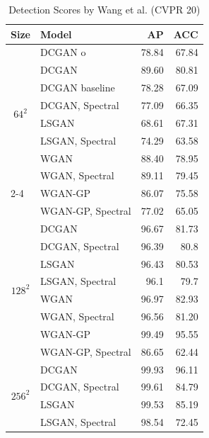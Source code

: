 \documentclass[letterpaper]{article} %
\begin{document}
\begin{table}
    \caption{Detection Scores by Wang et al. (CVPR 20)}
    \label{tab1}
    \centering
    \begin{tabular}{l|l|rr}
        \toprule
        Size & Model & AP&ACC\\
        \midrule
        
\multicolumn{1}{c|}{\multirow{8}{*}{$64^2$}} 
& DCGAN o& 78.84&67.84 \\
& DCGAN & 89.60&80.81 \\
& DCGAN baseline &78.28&67.09\\
  & DCGAN, Spectral &77.09&66.35\\ 
 \cline{2-4}
 & LSGAN &68.61&67.31 \\
 & LSGAN, Spectral &74.29&63.58 \\ \cline{2-4}
 & WGAN & 88.40&78.95\\
 & WGAN, Spectral &  89.11&79.45\\ \cline{2-4}
 & WGAN-GP & 86.07&75.58\\
 & WGAN-GP, Spectral&77.02&65.05\\ \midrule
\multicolumn{1}{c|}{\multirow{8}{*}{$128^2$}} & DCGAN &96.67&81.73\\
 & DCGAN, Spectral & 96.39&80.8\\ \cline{2-4}
 & LSGAN & 96.43&80.53 \\
 & LSGAN, Spectral &96.1&79.7  \\ \cline{2-4}
 & WGAN &96.97&82.93  \\
 & WGAN, Spectral& 96.56&81.20\\ \cline{2-4}
 & WGAN-GP &99.49&95.55  \\ 
 & WGAN-GP, Spectral &86.65&62.44 \\\midrule
\multicolumn{1}{c|}{\multirow{4}{*}{$256^2$}} & DCGAN &99.93& 96.11\\
 & DCGAN, Spectral &99.61&84.79\\ \cline{2-4}
 & LSGAN & 99.53&85.19 \\
 & LSGAN, Spectral &  98.54&72.45\\ \bottomrule

    \end{tabular}
\end{table}
\fi
\end{document}
